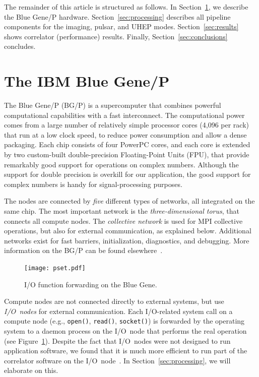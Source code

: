The remainder of this article is structured as follows.
In Section~\ref{sec:BG/P}, we describe the Blue Gene/P hardware.
Section~\ref{sec:processing} describes all pipeline components for the
imaging, pulsar, and UHEP modes.
Section~\ref{sec:results} shows correlator (performance) results.
Finally, Section~\ref{sec:conclusions} concludes.


\section{The IBM Blue Gene/P}
\label{sec:BG/P}

The Blue Gene/P (BG/P) is a supercomputer that combines powerful computational
capabilities with a fast interconnect.
The computational power comes from a large number of relatively simple
processor cores (4,096 per rack) that run at a low clock speed, to reduce
power consumption and allow a dense packaging.
Each chip consists of four PowerPC cores, and each core is extended by
two custom-built double-precision Floating-Point Units (FPU), that provide
remarkably good support for operations on complex numbers.
Although the support for double precision is overkill for our application,
the good support for complex numbers is handy for signal-processing purposes.

The nodes are connected by \emph{five\/} different types of networks,
all integrated on the same chip.
The most important network is the \emph{three-dimensional torus}, that
connects all compute nodes.
The \emph{collective network\/} is used for MPI collective operations,
but also for external communication, as explained below.
Additional networks exist for fast barriers, initialization, diagnostics, and
debugging.
More information on the BG/P can be found elsewhere~\cite{IBM:08}.

\begin{figure}
\vspace{-9mm}
\begin{center}
\texttt{[image: pset.pdf]}
\end{center}
\caption{I/O function forwarding on the Blue Gene.}
\vspace{-5mm}
\label{fig:pset}
\end{figure}
Compute nodes are not connected directly to external systems, but use
\emph{I/O~nodes\/} for external communication.
Each I/O-related system call on a compute node (e.g., \texttt{open()},
\texttt{read()}, \texttt{socket()}) is forwarded by the operating system to
a daemon process on the I/O~node that performs the real operation (see
Figure~\ref{fig:pset}).
Despite the fact that I/O~nodes were not designed to run application software,
we found that it is much more efficient to run part of the correlator
software on the I/O~node~\cite{Iskra:08}.
In Section~\ref{sec:processing}, we will elaborate on this.

